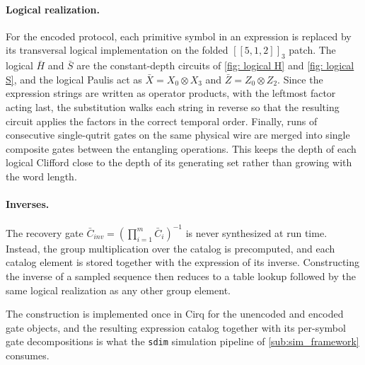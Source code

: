 \paragraph{Logical realization.}
For the encoded protocol, each primitive symbol in an expression is replaced by its transversal logical implementation on the folded $[[5,1,2]]_3$ patch. The logical $\bar{H}$ and $\bar{S}$ are the constant-depth circuits of \autoref{fig: logical H} and \autoref{fig: logical S}, and the logical Paulis act as $\bar{X} = X_0 \otimes X_3$ and $\bar{Z} = Z_0 \otimes Z_2$. Since the expression strings are written as operator products, with the leftmost factor acting last, the substitution walks each string in reverse so that the resulting circuit applies the factors in the correct temporal order. Finally, runs of consecutive single-qutrit gates on the same physical wire are merged into single composite gates between the entangling operations. This keeps the depth of each logical Clifford close to the depth of its generating set rather than growing with the word length.

\paragraph{Inverses.}
The recovery gate $\bar{C}_{inv} = (\prod_{i=1}^m \bar{C}_i)^{-1}$ is never synthesized at run time. Instead, the group multiplication over the catalog is precomputed, and each catalog element is stored together with the expression of its inverse. Constructing the inverse of a sampled sequence then reduces to a table lookup followed by the same logical realization as any other group element.

The construction is implemented once in Cirq for the unencoded and encoded gate objects, and the resulting expression catalog together with its per-symbol gate decompositions is what the \texttt{sdim} simulation pipeline of \autoref{sub:sim_framework} consumes.
